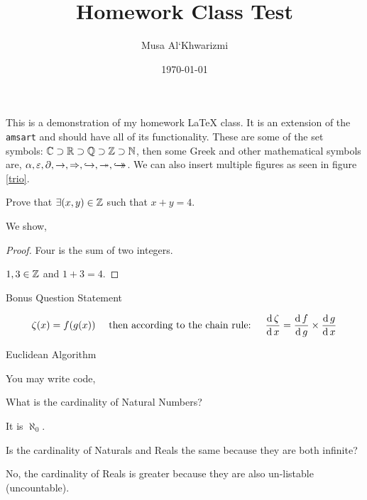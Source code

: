 \documentclass{homework}
\author{Musa Al`Khwarizmi}
\date{\today}
\title{Homework Class Test}
\begin{document}
 \maketitle

This is a demonstration of my homework \LaTeX{} class. It is an extension of the \texttt{amsart} and should have all of its functionality. These are some of the set symbols: $\bC \supset \bR \supset \bQ \supset \bZ \supset \bN$, then some Greek and other mathematical symbols are, $\al, \ep, \p, \ra, \Ra, \injective, \surjective, \bijective$. We can also insert multiple figures as seen in figure \ref{trio}.


\begin{question} Prove that $\exists (x,y) \in \bZ$ such that $x+y = 4$.

  We show,
  \begin{proof} Four is the sum of two integers.
    
    $1,3 \in \bZ$ and $1+3=4$.
  \end{proof}
\end{question}


\begin{bonus} Bonus Question Statement 

  \lipsum[2]
  \[
    \zeta(x) = f(g(x)) \quad \text{ then according to the chain rule: } \quad
    \derivative{\zeta} = \derivative[g]{f} \times \derivative{g}
  \]
\end{bonus}

\begin{bonus} Euclidean Algorithm

  You may write code,
  
  
\end{bonus}

\begin{question} What is the cardinality of Natural Numbers?
    
  It is $\aleph_0$.
\end{question}

\begin{question} Is the cardinality of Naturals and Reals the same because they are both infinite?

  No, the cardinality of Reals is greater because they are also un-listable (uncountable).
\end{question}
\end{document}
